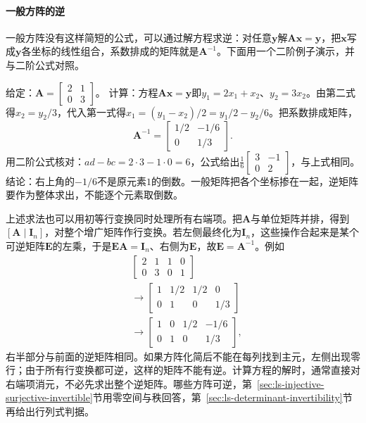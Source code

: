 \paragraph{一般方阵的逆}
一般方阵没有这样简短的公式，可以通过解方程求逆：对任意$\bm y$解$\bm A\bm x=\bm y$，把$\bm x$写成$\bm y$各坐标的线性组合，系数排成的矩阵就是$\bm A^{-1}$。下面用一个二阶例子演示，并与二阶公式对照。
\begin{example}[解方程求逆]
\label{ex:ls-inverse-by-solving}
给定：$\bm A=\left[\begin{smallmatrix}2&1\\0&3\end{smallmatrix}\right]$。
计算：方程$\bm A\bm x=\bm y$即$y_1=2x_1+x_2$、$y_2=3x_2$。由第二式得$x_2=y_2/3$，代入第一式得$x_1=(y_1-x_2)/2=y_1/2-y_2/6$。把系数排成矩阵，
\[
 \bm A^{-1}=\begin{bmatrix}1/2&-1/6\\0&1/3\end{bmatrix}.
\]
用二阶公式核对：$ad-bc=2\cdot3-1\cdot0=6$，公式给出$\frac16\left[\begin{smallmatrix}3&-1\\0&2\end{smallmatrix}\right]$，与上式相同。
结论：右上角的$-1/6$不是原元素$1$的倒数。一般矩阵把各个坐标掺在一起，逆矩阵要作为整体求出，不能逐个元素取倒数。
\end{example}
上述求法也可以用初等行变换同时处理所有右端项。把$\bm A$与单位矩阵并排，得到$[\bm A\mid\bm I_n]$，对整个增广矩阵作行变换。若左侧最终化为$\bm I_n$，这些操作合起来是某个可逆矩阵$\bm E$的左乘，于是$\bm E\bm A=\bm I_n$、右侧为$\bm E$，故$\bm E=\bm A^{-1}$。例如
\[
 \begin{aligned}
 &\left[\begin{array}{cc|cc}2&1&1&0\\0&3&0&1\end{array}\right]\\
 &\longrightarrow
 \left[\begin{array}{cc|cc}1&1/2&1/2&0\\0&1&0&1/3\end{array}\right]\\
 &\longrightarrow
 \left[\begin{array}{cc|cc}1&0&1/2&-1/6\\0&1&0&1/3\end{array}\right],
 \end{aligned}
\]
右半部分与前面的逆矩阵相同。如果方阵化简后不能在每列找到主元，左侧出现零行；由于所有行变换都可逆，这样的矩阵不能有逆。计算方程的解时，通常直接对右端项消元，不必先求出整个逆矩阵。哪些方阵可逆，第~\ref{sec:ls-injective-surjective-invertible}节用零空间与秩回答，第~\ref{sec:ls-determinant-invertibility}节再给出行列式判据。

